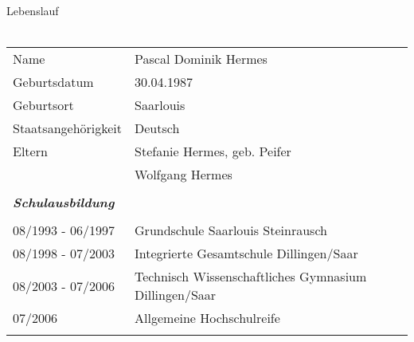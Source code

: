 \LARGE{Lebenslauf}
\\\mbox{}\\
\thispagestyle{empty}
\normalsize

\begin{table}[h]
\begin{tabular}{ll}
Name & Pascal Dominik Hermes \\
Geburtsdatum & 30.04.1987 \\
Geburtsort     & Saarlouis      \\
Staatsangeh\"{o}rigkeit     &      Deutsch \\ 
Eltern & Stefanie Hermes, geb. Peifer \\
 &  Wolfgang Hermes \\
 & \\




\multicolumn{2}{l}{\textit{\textbf{Schulausbildung}}}\\
 & \\
08/1993 - 06/1997 & Grundschule Saarlouis Steinrausch \\
08/1998 - 07/2003 & Integrierte Gesamtschule Dillingen/Saar \\
08/2003 - 07/2006 & Technisch Wissenschaftliches Gymnasium Dillingen/Saar \\
\phantom{08/2003 - }07/2006 & Allgemeine Hochschulreife \\
 & \\
\end{tabular}
\end{table}


